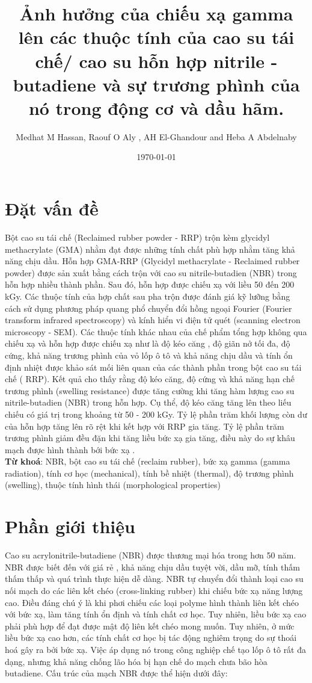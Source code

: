 \documentclass[12pt,a4paper]{article}
\title{Ảnh hưởng của chiếu xạ gamma lên các thuộc tính của cao su tái chế/ cao su hỗn hợp nitrile - butadiene và sự trương phình của nó trong động cơ và dầu hãm.}
\author{
Medhat M Hassan, Raouf O Aly , AH El-Ghandour and Heba A Abdelnaby}
\date{\today}
\begin{document}
\maketitle
	\tableofcontents
	\newpage
	\section{Đặt vấn đề}
	
Bột cao su tái chế (Reclaimed rubber powder - RRP) trộn kèm glycidyl methacrylate (GMA) nhằm đạt được những tính chất phù hợp nhằm tăng khả năng chịu dầu. Hỗn hợp GMA-RRP (Glycidyl methacrylate - Reclaimed rubber powder) được sản xuất bằng cách trộn với cao su nitrile-butadien (NBR) trong hỗn hợp nhiều thành phần. Sau đó, hỗn hợp được chiếu xạ với liều 50 đến 200 kGy. Các thuộc tính của hợp chất sau pha trộn được đánh giá kỹ lưỡng bằng cách sử dụng phương pháp quang phổ chuyển đổi hồng ngoại Fourier (Fourier transform infrared spectroscopy) và kính hiển vi điện tử quét (scanning electron microscopy - SEM). Các thuộc tính khác nhau của chế phẩm tổng hợp không qua chiếu xạ và hỗn hợp được chiếu xạ như là độ kéo căng , độ giãn nở tối đa, độ cứng, khả năng trương phình của vỏ lốp ô tô và khả năng chịu dầu và tính ổn định nhiệt được khảo sát mối liên quan của các thành phần trong bột cao su tái chế ( RRP). Kết quả cho thấy rằng độ kéo căng, độ cứng và khả năng hạn chế trương phình (swelling resistance) được tăng cường khi tăng hàm lượng cao su nitrile-butadien (NBR) trong hỗn hợp. Cụ thể, độ kéo căng tăng lên theo liếu chiếu có giá trị trong khoảng từ 50 - 200 kGy. Tỷ lệ phần trăm khối lượng còn dư của hỗn hợp tăng lên rõ rệt khi kết hợp với RRP gia tăng. Tỷ lệ phần trăm trương phình giảm đều đặn khi tăng liều bức xạ gia tăng, điều này do sự khâu mạch được hình thành bới bức xạ .\\

\textbf{Từ khoá}: NBR, bột cao su tái chế (reclaim rubber), bức xạ gamma (gamma radiation), tính cơ học (mechanical), tính bề nhiệt (thermal), độ trương phình (swelling), thuộc tính hình thái (morphological properties)

	\section{Phần giới thiệu}
\vspace{0.4em}
Cao su acrylonitrile-butadiene (NBR) được thương mại hóa trong hơn 50 năm. NBR được biết đến với giá rẻ , khả năng chịu dầu tuyệt vời, dầu mỡ, tính thấm thấm thấp và quá trình thực hiện dễ dàng. NBR tự chuyển đổi thành loại cao su nối mạch do các liên kết chéo (cross-linking rubber) khi chiếu bức xạ năng lượng cao. Điều đáng chú ý là khi phơi chiếu các loại polyme hình thành liên kết chéo với bức xạ, làm tăng tính ổn định và tính chất cơ học. Tuy nhiên, liều bức xạ cao phải phù hợp để đạt được mật độ liên kết chéo mong muốn. Tuy nhiên, ở mức liều bức xạ cao hơn, các tính chất cơ học bị tác động nghiêm trọng do sự thoái hoá gây ra bởi bức xạ. Việc áp dụng nó trong công nghiệp chế tạo lốp ô tô rất đa dạng, nhưng khả năng chống lão hóa bị hạn chế do mạch chưa bão hòa butadiene. Cấu trúc của mạch NBR được thể hiện dưới đây:
   
\end{document}

